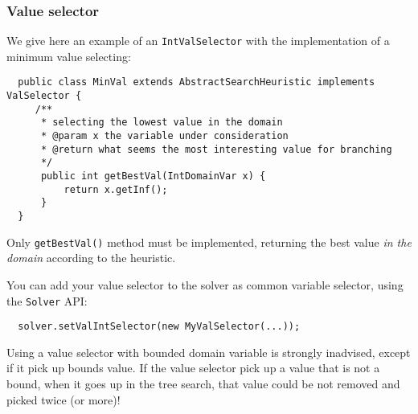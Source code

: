 \subsubsection{Value selector}\label{advanced:valueselector}\hypertarget{advanced:valueselector}{}
We give here an example of an \texttt{IntValSelector} with the implementation of a minimum value selecting:
\begin{lstlisting}
  public class MinVal extends AbstractSearchHeuristic implements ValSelector {
	 /**
      * selecting the lowest value in the domain
      * @param x the variable under consideration
      * @return what seems the most interesting value for branching
      */
	  public int getBestVal(IntDomainVar x) {
          return x.getInf();
	  }
  }
\end{lstlisting}
Only \texttt{getBestVal()} method must be implemented, returning the best value \emph{in the domain} according to the heuristic.

You can add your value selector to the solver as common variable selector, using the \texttt{Solver} API:
\begin{lstlisting}
  solver.setValIntSelector(new MyValSelector(...));
\end{lstlisting}

\begin{note}
Using a value selector with bounded domain variable is strongly inadvised, except if it pick up bounds value. If the value selector pick up a value that is not a bound, when it goes up in the tree search, that value could be not removed and picked twice (or more)!
\end{note} 

